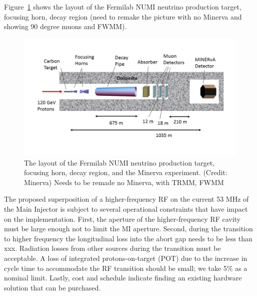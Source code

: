 
Figure~\ref{fig:numi_horn} shows the layout of the Fermilab NUMI
neutrino production target, focusing horn, decay region (need to
remake the picture with no Minerva and showing 90 degree muons and FWMM). 


\begin{figure}[ht]
	\begin{center}
           	\includegraphics[width=1.0 \linewidth]{Figures/numi_horn_how_works.jpg}
	\end{center}
	\caption{The layout of the Fermilab NUMI neutrino production
          target, focusing horn, decay region, and the Minerva
          experiment. (Credit: Minerva) Needs to be remade no Minerva,
        with TRMM, FWMM}
	\label{fig:numi_horn}
\end{figure}





The proposed superposition of a higher-frequency RF on the current 53
MHz of the Main Injector is subject to several operational
constraints that have impact on the implementation. First, the
aperture of the higher-frequency RF cavity must be large enough not
to limit the MI aperture. Second, during the transition to higher
frequency the longitudinal loss into the abort gap needs to be less
than xxx. Radiation losses from other sources during the transition
must be acceptable. A loss of integrated protons-on-target (POT) due
to the increase in cycle time to accommodate the RF transition should
be small; we take 5\% as a nominal limit. Lastly, cost and schedule
indicate finding an existing hardware solution that can be purchased.


